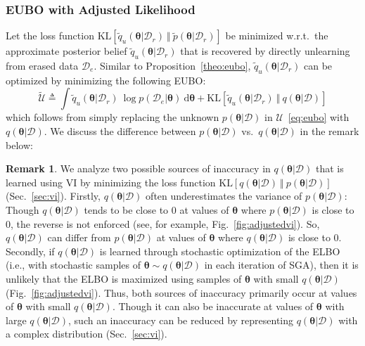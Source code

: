 \documentclass{article}
\theoremstyle{definition}
\newtheorem{remark}{Remark}
\newcommand{\mcl}[1]{\mathcal{#1}}
\newcommand{\da}{\mcl{D}}
\newcommand{\dc}{\mcl{D}_r}
\newcommand{\dr}{\mcl{D}_e}
\newcommand{\eubo}{\tilde{q}_u}
\begin{document}
\subsubsection{EUBO with Adjusted Likelihood}
\label{subsubsec:eubo}
%
Let the loss function $\text{KL}[\eubo(\bm{\theta}|\dc)\ \Vert\ \tilde{p}(\bm{\theta}|\dc)]$ be minimized w.r.t.~the approximate posterior belief $\eubo(\bm{\theta}|\dc)$ that is recovered by directly unlearning from erased data $\dr$. 
Similar to Proposition~\ref{theo:eubo}, $\eubo(\bm{\theta}|\dc)$ can be optimized by minimizing the following EUBO:
%
\begin{equation}
\widetilde{\mcl{U}} \triangleq \int \eubo(\bm{\theta}|\dc)\ \log p(\dr|\bm{\theta})\ \text{d}\bm{\theta} + \text{KL}[\eubo(\bm{\theta}|\dc)\ \Vert\ q(\bm{\theta}|\da)]
\label{eq:euboapprx}
\end{equation}
%
which follows from simply replacing the unknown $p(\bm{\theta}|\da)$ in $\mcl{U}$~\eqref{eq:eubo} with $q(\bm{\theta}|\da)$. 
We discuss the difference between $p(\bm{\theta}|\da)$ vs.~$q(\bm{\theta}|\da)$ in the remark below:\vspace{1mm}
%
\begin{remark}
\label{rmk:inacc}
We analyze two possible sources of inaccuracy in $q(\bm{\theta}|\da)$ that is learned using VI by minimizing the loss function $\text{KL}[q(\bm{\theta}|\da)\ \Vert\ p(\bm{\theta}|\da)]$ (Sec.~\ref{sec:vi}).
Firstly, $q(\bm{\theta}|\da)$ often underestimates the variance of $p(\bm{\theta}|\da)$: Though $q(\bm{\theta}|\da)$ tends to be close to $0$ at values of $\bm{\theta}$ where $p(\bm{\theta}|\da)$ is close to $0$, the reverse is not enforced \cite{bishop2006pattern} (see, for example, Fig.~\ref{fig:adjustedvi}).
So, $q(\bm{\theta}|\da)$ can differ from $p(\bm{\theta}|\da)$ at values of $\bm{\theta}$ where $q(\bm{\theta}|\da)$ is close to $0$.
Secondly, if $q(\bm{\theta}|\da)$ is learned through stochastic optimization of the ELBO (i.e., with stochastic samples of $\bm{\theta} \sim q(\bm{\theta}|\da)$ in each iteration of SGA), then it is unlikely that the ELBO is maximized using samples of $\bm{\theta}$ with small $q(\bm{\theta}|\da)$ (Fig.~\ref{fig:adjustedvi}). 
Thus, both sources of inaccuracy primarily occur at values of $\bm{\theta}$ with small $q(\bm{\theta}|\da)$. Though it can also be inaccurate at values of $\bm{\theta}$ with large $q(\bm{\theta}|\da)$, such an inaccuracy can be reduced by representing $q(\bm{\theta}|\da)$ with a complex distribution (Sec.~\ref{sec:vi}).
\end{remark}
\end{document}
